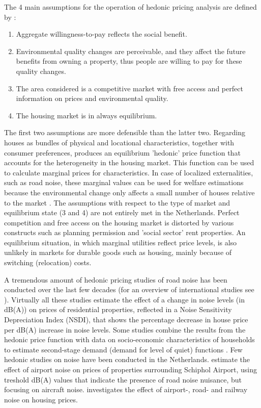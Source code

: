 \documentclass[12pt,a4paper]{scrartcl}
\begin{document}
		The 4 main assumptions for the operation of hedonic pricing analysis are defined by \cite{Bateman1993}:
		\begin{enumerate}
			\item Aggregate willingness-to-pay reflects the social benefit.
			\item Environmental quality changes are perceivable, and they affect the future benefits from owning a property, thus people are willing to pay for these quality changes.
			\item The area considered is a competitive market with free access and perfect information on prices and environmental quality.
			\item The housing market is in always equilibrium.
		\end{enumerate}
		
		The first two assumptions are more defensible than the latter two. Regarding houses as bundles of physical and locational characteristics, together with consumer preferences, produces an equilibrium 'hedonic' price function that accounts for the heterogeneity in the housing market. This function can be used to calculate marginal prices for characteristics. In case of localized externalities, such as road noise, these marginal values can be used for welfare estimations because the environmental change only affects a small number of houses relative to the market \citep{Nelson2008}. The assumptions with respect to the type of market and equilibrium state (3 and 4) are not entirely met in the Netherlands. Perfect competition and free access on the housing market is distorted by various constructs such as planning permission and 'social sector' rent properties. An equilibrium situation, in which marginal utilities reflect price levels, is also unlikely in markets for durable goods such as housing, mainly because of switching (relocation) costs. 
	
		A tremendous amount of hedonic pricing studies of road noise has been conducted over the last few decades (for an overview of international studies see \cite{Bateman2001,Navrud2011}). Virtually all these studies estimate the effect of a change in noise levels (in dB(A)) on prices of residential properties, reflected in a Noise Sensitivity Depreciation Index (NSDI), that shows the percentage decrease in house price per dB(A) increase in noise levels. Some studies combine the results from the hedonic price function with data on socio-economic characteristics of households to estimate second-stage demand (demand for level of quiet) functions \citep{Swardh2012,Day2007}. Few hedonic studies on noise have been conducted in the Netherlands. \cite{Dekkers2009} estimate the effect of airport noise on prices of properties surrounding Schiphol Airport, using treshold dB(A) values that indicate the presence of road noise nuisance, but focusing on aircraft noise. \cite{Theebe2004} investigates the effect of airport-, road- and railway noise on housing prices. 
\end{document}
